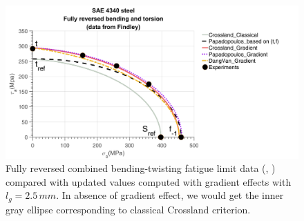 \begin{figure}[!h]
	\includegraphics[width=\textwidth]{figures//4340.png}
	\caption{Fully reversed combined bending-twisting fatigue limit data (\cite{findley1956theory}, \cite{Papadopoulos1996513}) compared with updated values computed with gradient effects with $l_g = 2.5 \, mm$. In absence of gradient effect, we would get the inner gray ellipse corresponding to classical Crossland criterion.}
	\label{4340}
\end{figure}



\newpage

